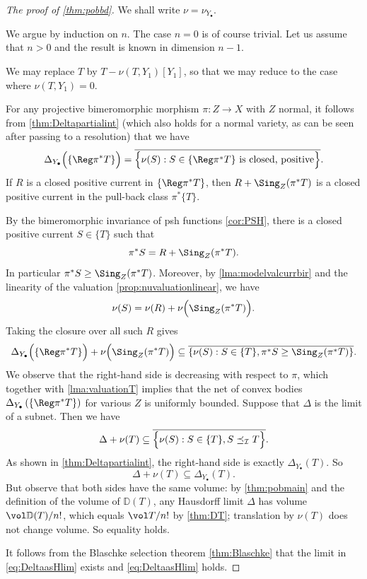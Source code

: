 \begin{proof}[The proof of \cref{thm:pobbd}]
We shall write $\nu=\nu_{Y_{\bullet}}$.

We argue by induction on $n$. The case $n=0$ is of course trivial. Let us assume that $n>0$ and the result is known in dimension $n-1$.

We may replace $T$ by $T-\nu(T,Y_1)[Y_1]$, so that we may reduce to the case where $\nu(T,Y_1)=0$.

For any projective bimeromorphic morphism $\pi\colon Z\rightarrow X$ with $Z$ normal, it follows from \cref{thm:Deltapartialint} (which also holds for a normal variety, as can be seen after passing to a resolution) that we have
\[
\Delta_{Y_{\bullet}}\Bigl(\{\Reg \pi^*T\}\Bigr)=\overline{ \Bigl\{\nu(S): S\in \{\Reg \pi^*T\}\textup{ is closed, positive} \Bigr\} }.
\]
If $R$ is a closed positive current in $\{\Reg \pi^*T\}$, then $R+\Sing_Z(\pi^*T)$ is a closed positive current in the pull-back class $\pi^*\{T\}$.

By the bimeromorphic invariance of psh functions \cref{cor:PSH}, there is a closed positive current $S\in\{T\}$ such that
    \[
        \pi^*S=R+\Sing_Z(\pi^*T).
    \]
    In particular $\pi^*S\geq \Sing_Z(\pi^*T)$. Moreover, by \cref{lma:modelvalcurrbir} and the linearity of the valuation \cref{prop:nuvaluationlinear}, we have
    \[
        \nu(S)=\nu(R)+\nu\Bigl(\Sing_Z(\pi^*T)\Bigr).
    \]
    Taking the closure over all such $R$ gives
    \[
    \Delta_{Y_{\bullet}}\Bigl(\{\Reg \pi^*T\}\Bigr)+\nu\Bigl(\Sing_Z(\pi^*T)\Bigr)\subseteq \overline{ \left\{\nu(S): S\in \{T\}, \pi^*S \geq \Sing_Z(\pi^*T) \right\} }.
    \]
We observe that the right-hand side is decreasing with respect to $\pi$, which together with \cref{lma:valuationT} implies that the net of convex bodies $\Delta_{Y_{\bullet}}\left(\{\Reg \pi^*T\}\right)$ for various $Z$ is uniformly bounded. Suppose that $\Delta$ is the limit of a subnet. Then we have
\[
\Delta+\nu(T)\subseteq \overline{ \Bigl\{\nu(S): S\in \{T\}, S \preceq_{\mathcal{I}} T \Bigr\} }.
\]
As shown in \cref{thm:Deltapartialint}, the right-hand side is exactly $\Delta_{Y_{\bullet}}(T)$. So
\[
\Delta+\nu(T)\subseteq \Delta_{Y_{\bullet}}(T).
\]
But observe that both sides have the same volume: by \cref{thm:pobmain} and the definition of the volume of $\mathbb{D}(T)$, any Hausdorff limit $\Delta$ has volume $\vol\mathbb{D}(T)/n!$, which equals $\vol T/n!$ by \cref{thm:DT}; translation by $\nu(T)$ does not change volume. So equality holds.

It follows from the Blaschke selection theorem \cref{thm:Blaschke} that the limit in \eqref{eq:DeltaasHlim} exists and \eqref{eq:DeltaasHlim} holds.
\end{proof}
